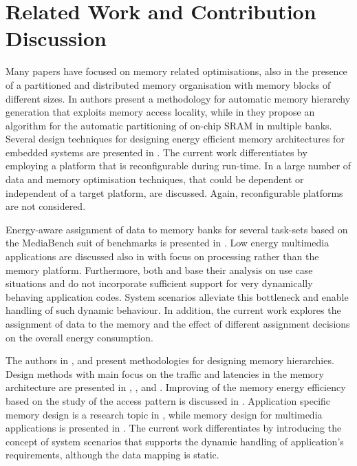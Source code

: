 \documentclass[smallextended]{svjour3}
\begin{document}
\section{Related Work and Contribution Discussion}
\label{sec:related}

Many papers have focused on memory related optimisations, also in the presence of a partitioned and distributed memory organisation with memory blocks of different sizes. 
In \cite{Ben00b} authors present a methodology for automatic memory hierarchy generation that exploits memory access locality, while in \cite{Ben00c} they propose an algorithm for the automatic partitioning of on-chip SRAM in multiple banks. 
Several design techniques for designing energy efficient memory architectures for embedded systems are presented in \cite{Mac02}. 
The current work differentiates by employing a platform that is reconfigurable during run-time. 
In \cite{Pgk01} a large number of data and memory optimisation techniques, that could be dependent or independent of a target platform, are discussed. 
Again, reconfigurable platforms are not considered.

Energy-aware assignment of data to memory banks for several task-sets based on the MediaBench suit of benchmarks is presented in \cite{Mar03}. 
Low energy multimedia applications are discussed also in \cite{Chu02} with focus on processing rather than the memory platform. 
Furthermore, both \cite{Mar03} and \cite{Chu02} base their analysis on use case situations and do not incorporate sufficient support for very dynamically behaving application codes. 
System scenarios alleviate this bottleneck and enable handling of such dynamic behaviour. 
In addition, the current work explores the assignment of data to the memory and the effect of different assignment decisions on the overall energy consumption.

The authors in \cite{abraham1999automatic}, \cite{jacob1996analytical} and \cite{li1999hardware} present methodologies for designing memory hierarchies.
Design methods with main focus on the traffic and latencies in the memory architecture are presented in \cite{chen1999loop}, \cite{grun2000mist}, \cite{jantsch1994hardware} and \cite{passes1995multi}.
Improving of the memory energy efficiency based on the study of the access pattern is discussed in \cite{kandemir2001improving}.
Application specific memory design is a research topic in \cite{schmit1997synthesis}, while memory design for multimedia applications is presented in \cite{oshima1997high}.
The current work differentiates by introducing the concept of system scenarios that supports the dynamic handling of application's requirements, although the data mapping is static. 
\end{document}

